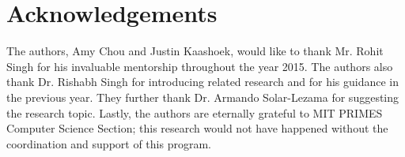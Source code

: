 \section{Acknowledgements} 

The authors, Amy Chou and Justin Kaashoek, would like to thank Mr. Rohit Singh for his invaluable mentorship throughout the year 2015. The authors also thank Dr. Rishabh Singh for introducing related research and for his guidance in the previous year. They further thank Dr. Armando Solar-Lezama for suggesting the research topic. Lastly, the authors are eternally grateful to MIT PRIMES Computer Science Section; this research would not have happened without the coordination and support of this program.
